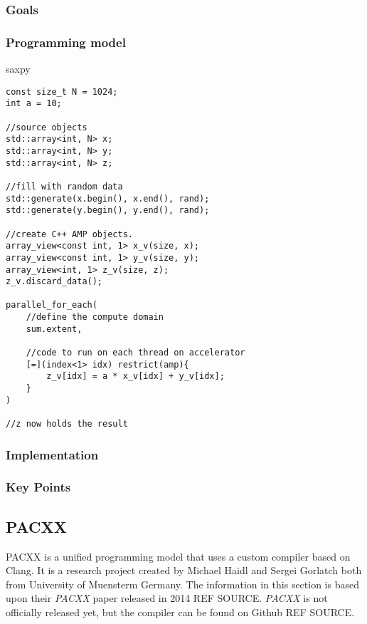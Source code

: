 \subsubsection{Goals}

\subsubsection{Programming model}
saxpy
\begin{lstlisting}[caption={C++ AMP saxpy example}, label={code:cppampSaxpy}]
const size_t N = 1024;
int a = 10;

//source objects
std::array<int, N> x;
std::array<int, N> y;
std::array<int, N> z;

//fill with random data
std::generate(x.begin(), x.end(), rand);
std::generate(y.begin(), y.end(), rand);

//create C++ AMP objects.
array_view<const int, 1> x_v(size, x);
array_view<const int, 1> y_v(size, y);
array_view<int, 1> z_v(size, z);
z_v.discard_data();

parallel_for_each(
    //define the compute domain
    sum.extent,

    //code to run on each thread on accelerator
    [=](index<1> idx) restrict(amp){
        z_v[idx] = a * x_v[idx] + y_v[idx];
    }
)

//z now holds the result
\end{lstlisting}

\subsubsection{Implementation}

\subsubsection{Key Points}


\subsection{PACXX}
PACXX is a unified programming model that uses a custom compiler based on Clang. It is a research project created by Michael Haidl and Sergei Gorlatch both from University of Muensterm Germany. The information in this section is based upon their \textit{PACXX} paper released in 2014 REF SOURCE. \textit{PACXX} is not officially released yet, but the compiler can be found on Github REF SOURCE.

